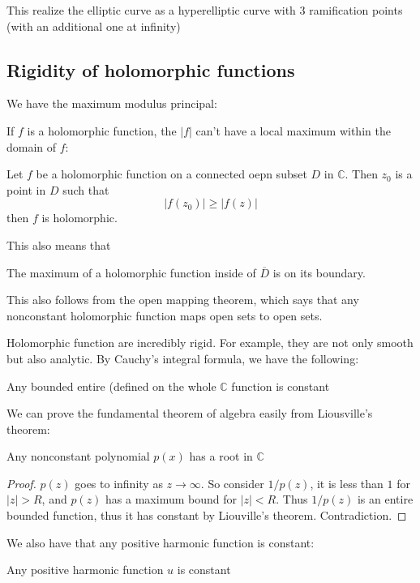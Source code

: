 \documentclass[main.tex]{subfiles}
\begin{document}
This realize the elliptic curve as a hyperelliptic curve with 3 ramification points (with an additional one at infinity)
\subsection{Rigidity of holomorphic functions}

We have the maximum modulus principal:

If $f$ is a holomorphic function, the $|f|$ can't have a local maximum within the domain of $f$:

\begin{theorem}
Let $f$ be a holomorphic function on a connected oepn subset $D$ in $\mathbb{C}$. Then $z_0$ is a point in $D$ such that 
$$
|f(z_0)| \geq |f(z)|
$$
then $f$ is holomorphic.
\end{theorem}
This also means that 

\begin{corollary}
The maximum of a holomorphic function inside of $\overline{D}$ is on its boundary.
\end{corollary}
This also follows from the open mapping theorem, which says that any nonconstant holomorphic function maps open sets to open sets.

Holomorphic function are incredibly rigid. For example, they are not only smooth but also analytic. By Cauchy's integral formula, we have the following:

\begin{theorem}
Any bounded entire (defined on the whole $\mathbb{C}$ function is constant
\end{theorem}

We can prove the fundamental theorem of algebra easily from Liousville's theorem:

\begin{corollary}
Any nonconstant polynomial $p(x)$ has a root in $\mathbb{C}$
\end{corollary}
\begin{proof}
$p(z)$ goes to infinity as $z \rightarrow \infty$. So consider $1/p(z)$, it is less than $1$ for $|z| > R$, and $p(z)$ has a  maximum bound for $|z| < R$. Thus $1/p(z)$ is an entire bounded function, thus it has constant by Liouville's theorem. Contradiction.
\end{proof}

We also have that any positive harmonic function is constant:

\begin{corollary}
Any positive harmonic function $u$ is constant
\end{corollary}
\end{document}
